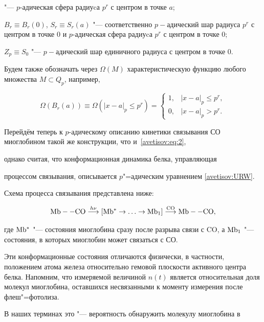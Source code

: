 "--- $p$-адическая сфера радиуcа $p^{r}$ с центром в точке $a$; 

$B_{r}\equiv B_{r}(0)$, $S_{r}\equiv S_{r}(a)$ "--- соответственно $p-$адический шар радиуса $p^{r}$ с центром в точке $0$ и $p$-адическая сфера радиуcа $p^{r}$ с центром в точке 0; 

$Z_{p}\equiv S_{0}$ "--- $p-$адический шар единичного радиуса с центром в точке $0$. 

Будем также обозначать через $\Omega(M)$ характеристическую функцию любого множества $M\subset Q_{p}$, например,

\[

\Omega(B_{r}(a))\equiv\Omega(|x-a|_{p}\leq p^{r})=\begin{cases}

1, & |x-a|_{p}\leq p^{r},\\

0, & |x-a|_{p}>p^{r}.

\end{cases}

\]



Перейдём теперь к $p$-адическому описанию кинетики связывания СО миоглобином такой же конструкции, что и~\eqref{avetisov:eq:2},

однако считая, что конформационная динамика белка, управляющая

процессом связывания, описывается $p$"=адическим уравнением \eqref{avetisov:URW}. 

Схема процесса связывания представлена ниже:

\[

{\rm Mb--CO} \stackrel{h\nu}{\longrightarrow}[{\rm

Mb^{*}}\to\ldots\to{\rm Mb_{1}}]\stackrel{{\rm

CO}}{\longrightarrow}{\rm Mb--CO},

\]

где ${\rm Mb^{*}}$ "--- состояния миоглобина сразу после разрыва связи с CO, а ${\rm Mb_{1}}$ "--- состояния, в которых миоглобин может связаться с СО. 

Эти конформационные состояния отличаются физически, в частности, положением атома железа относительно гемовой плоскости активного центра белка. Напомним, что измеряемой величиной $n(t)$ является относительная доля молекул миоглобина, оставшихся несвязанными к моменту измерения после флеш"=фотолиза. 

В наших терминах это "--- вероятность обнаружить молекулу миоглобина в

